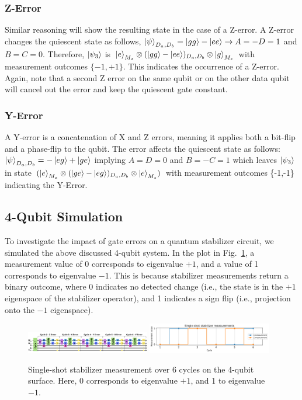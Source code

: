 \documentclass[9pt,a4paper,twocolumn,twoside]{tau-class/tau}
\begin{document}
\subsubsection*{Z-Error}
Similar reasoning will show the resulting state in the case of a Z-error. A Z-error changes the quiescent state as follows, $\ket{\psi}_{D_a,D_b}=\ket{gg} - \ket{ee} \rightarrow A=-D=1$ and $B=C=0$. Therefore, $\ket{\psi_3}$ is $\ket{e}_{M_x} \otimes (\ket{gg}-\ket{ee})_{D_a,D_b} \otimes \ket{g}_{M_z}$ with measurement outcomes $\{-1,+1\}$. This indicates the occurrence of a Z-error. Again, note that a second Z error on the same qubit or on the other data qubit will cancel out the error and keep the quiescent gate constant. 
\subsubsection*{Y-Error}
A Y-error is a concatenation of X and Z errors, meaning it applies both a bit-flip and a phase-flip to the qubit. The error affects the quiescent state as follows: $\ket{\psi}_{D_a,D_b} = -\ket{eg} + \ket{ge}$ implying $A=D=0$ and $B=-C=1$ which leaves $\ket{\psi_3}$ in state $(\ket{e}_{M_x} \otimes (\ket{ge}-\ket{eg})_{D_a,D_b} \otimes \ket{e}_{M_z})$ with measurement outcomes \{-1,-1\} indicating the Y-Error. 
\subsection{4-Qubit Simulation}
To investigate the impact of gate errors on a quantum stabilizer circuit, we simulated the above discussed 4-qubit system. In the plot in Fig.~\ref{fig:eigenvallues4qubtswitherror}, a measurement value of 0 corresponds to eigenvalue $+1$, and a value of 1 corresponds to eigenvalue $-1$. This is because stabilizer measurements return a binary outcome, where 0 indicates no detected change (i.e., the state is in the $+1$ eigenspace of the stabilizer operator), and 1 indicates a sign flip (i.e., projection onto the $-1$ eigenspace).
\begin{figure}[htbp]
    \centering
    \includegraphics[width=0.48\textwidth]{figures/Circuit4qubitsErrors.png}
    \includegraphics[width=0.48\textwidth]{figures/EigenvaluePlot4qubitsErrors.png}
    \caption{Single-shot stabilizer measurement over 6 cycles on the 4-qubit surface. Here, 0 corresponds to eigenvalue $+1$, and 1 to eigenvalue $-1$.}
    \label{fig:eigenvallues4qubtswitherror}
\end{figure}
\end{document}
